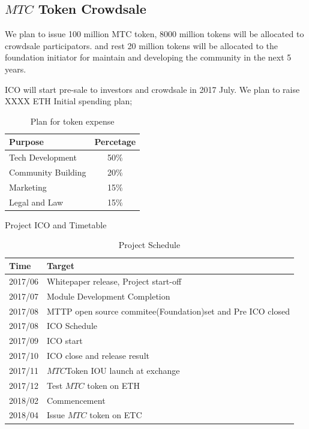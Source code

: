 \documentclass[UTF8,nofonts]{article}
\begin{document}
\begin{appendices}
\section{$MTC$ Token Crowdsale\label{sec: ico}}

We plan to issue 100 million MTC token,  8000 million tokens will be allocated to crowdsale participators. and rest 20 million tokens will be allocated to the foundation initiator for maintain and developing the community in the next 5 years.

ICO will start pre-sale to investors and crowdsale in 2017 July. We plan to raise XXXX ETH
Initial spending plan;

\begin{table}[hbt]
 \centering
 \begin{tabular}{l|c}
   Purpose    & Percetage\\
  \hline
 Tech Development  & 50\% \\
 Community Building & 20\% \\
 Marketing     & 15\% \\
 Legal and Law   & 15\% \\
 \end{tabular}
 \caption{ Plan for token expense}
\end{table}



Project ICO and Timetable
\begin{table}[hbt]
 \centering
 \begin{tabular}{l|l}
Time  & Target\\
  \hline
 2017/06 & Whitepaper release, Project start-off \\
 2017/07 & Module Development Completion \\
 2017/08 & MTTP open source commitee(Foundation)set and Pre ICO closed \\
 2017/08 & ICO Schedule \\
 2017/09 & ICO start \\
 2017/10 & ICO close and release result \\
 2017/11 & $MTC$Token IOU launch at exchange \\
 2017/12 & Test $MTC$ token on ETH \\
 2018/02 & Commencement \\
 2018/04 & Issue $MTC$ token on ETC \\
 \end{tabular}
 \caption{Project Schedule}
\end{table}


\end{appendices}
\end{document}

